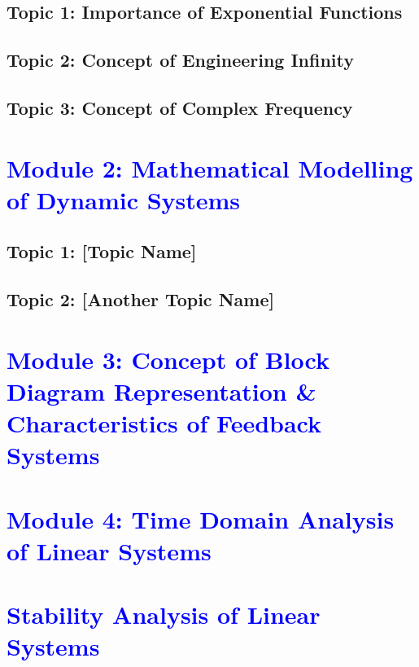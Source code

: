 \documentclass[12pt]{report}
\begin{document}
\section{Topic 1: Importance of Exponential Functions}

\section{Topic 2: Concept of Engineering Infinity}

\section{Topic 3: Concept of Complex Frequency}

\clearpage

\chapter{\textcolor{blue}{Module 2: Mathematical Modelling of Dynamic Systems}}

\section{Topic 1: [Topic Name]}

\section{Topic 2: [Another Topic Name]}

\clearpage

\chapter{\textcolor{blue}{Module 3: Concept of Block Diagram Representation \& Characteristics of Feedback Systems}}

\clearpage

\chapter{\textcolor{blue}{Module 4: Time Domain Analysis of Linear Systems}}

\clearpage

\chapter{\textcolor{blue}{Stability Analysis of Linear Systems}}
\end{document}
